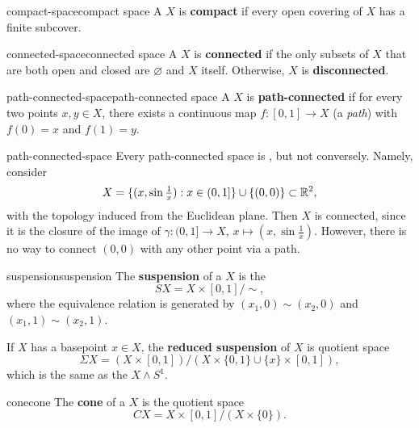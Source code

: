 \begin{topic}{compact-space}{compact space}
    A  $X$ is \textbf{compact} if every open covering of $X$ has a finite subcover.
\end{topic}

\begin{topic}{connected-space}{connected space}
    A  $X$ is \textbf{connected} if the only subsets of $X$ that are both open and closed are $\varnothing$ and $X$ itself. Otherwise, $X$ is \textbf{disconnected}.
\end{topic}

\begin{topic}{path-connected-space}{path-connected space}
    A  $X$ is \textbf{path-connected} if for every two points $x, y \in X$, there exists a continuous map $f \colon [0, 1] \to X$ (a \textit{path}) with $f(0) = x$ and $f(1) = y$.
\end{topic}

\begin{example}{path-connected-space}
    Every path-connected space is , but not conversely. Namely, consider
    \[ X = \{ (x, \sin \tfrac{1}{x}) : x \in (0, 1] \} \cup \{ (0, 0) \} \subset \mathbb{R}^2 , \]
    with the topology induced from the Euclidean plane. Then $X$ is connected, since it is the closure of the image of $\gamma \colon (0, 1] \to X$, $x \mapsto (x, \sin \tfrac{1}{x})$. However, there is no way to connect $(0, 0)$ with any other point via a path.
\end{example}

\begin{topic}{suspension}{suspension}
    The \textbf{suspension} of a  $X$ is the 
    \[ S X = X \times [0, 1] / \sim{} , \]
    where the equivalence relation is generated by $(x_1, 0) \sim{} (x_2, 0)$ and $(x_1, 1) \sim{} (x_2, 1)$.
    
    If $X$ has a basepoint $x \in X$, the \textbf{reduced suspension} of $X$ is quotient space
    \[ \Sigma X = (X \times [0, 1]) / (X \times \{ 0, 1 \} \cup \{ x \} \times [0, 1]) , \]
    which is the same as the  $X \wedge S^1$.
\end{topic}

\begin{topic}{cone}{cone}
    The \textbf{cone} of a  $X$ is the quotient space
    \[ CX = X \times [0, 1] / (X \times \{ 0 \}) . \]
\end{topic}

